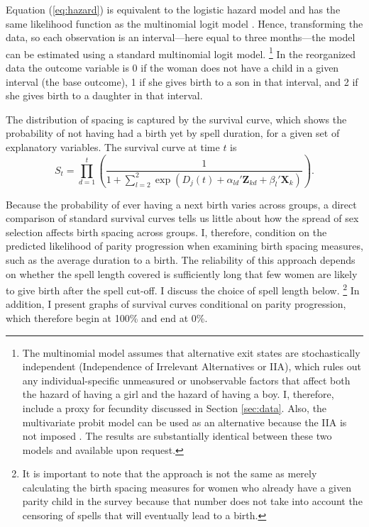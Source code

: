 \documentclass[12pt,letterpaper]{article}
\begin{document}
Equation (\ref{eq:hazard}) is equivalent to the logistic hazard model and has the same 
likelihood function as the multinomial logit model \citep{allison82,jenkins95}.
Hence, transforming the data, so each observation is an interval---here equal
to three months---the model can be estimated using a standard multinomial logit model.%
\footnote{
The multinomial model assumes that alternative exit states are stochastically independent
(Independence of Irrelevant Alternatives or IIA), which rules out any individual-specific 
unmeasured or unobservable factors that affect both the hazard of having a girl and the 
hazard of having a boy.
I, therefore, include a proxy for fecundity discussed in Section \ref{sec:data}.
Also, the multivariate probit model can be used as an alternative because the IIA is not 
imposed \citep{han90}.
The results are substantially identical between these two models and
available upon request.
}
In the reorganized data the outcome variable is 0 if the woman does not have a child in a 
given interval (the base outcome), 1 if she gives birth to a son in that interval, and 2 
if she gives birth to a daughter in that interval.

The distribution of spacing is captured by the survival curve, which shows the probability 
of not having had a birth yet by spell duration, for a given set of explanatory variables.
The survival curve at time $t$ is 
\begin{equation}
\label{eq:survival}
S_{t} 
= 
\prod_{d=1}^t
\left(
\frac{ 1 }
{1 + \sum_{l=2}^2 \exp(D_j(t) + \alpha_{ld}'\mathbf{Z}_{kd} + \beta_l'\mathbf{X}_{k})}
\right).
\end{equation}

Because the probability of ever having a next birth varies across groups, a direct 
comparison of standard survival curves tells us little about how the spread of sex 
selection affects birth spacing across groups.
I, therefore, condition on the predicted likelihood of parity progression when examining 
birth spacing measures, such as the average duration to a birth.
The reliability of this approach depends on whether the spell length covered is 
sufficiently long that few women are likely to give birth after the spell cut-off.
I discuss the choice of spell length below.%
\footnote{
It is important to note that the approach is not the same as merely calculating 
the birth spacing measures for women who already have a given 
parity child in the survey because that number does not take into account
the censoring of spells that will eventually lead to a birth.
}
In addition, I present graphs of survival curves conditional on parity progression,
which therefore begin at 100\% and end at 0\%.
\end{document}
